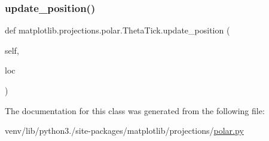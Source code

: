 \subsubsection{\texorpdfstring{update\+\_\+position()}{update\_position()}}
{\footnotesize\ttfamily def matplotlib.\+projections.\+polar.\+Theta\+Tick.\+update\+\_\+position (\begin{DoxyParamCaption}\item[{}]{self,  }\item[{}]{loc }\end{DoxyParamCaption})}



The documentation for this class was generated from the following file\+:\begin{DoxyCompactItemize}
\item 
venv/lib/python3./site-\/packages/matplotlib/projections/\hyperlink{polar_8py}{polar.\+py}\end{DoxyCompactItemize}
